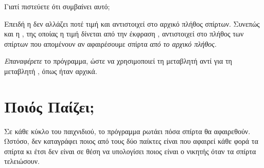\documentclass[a4paper,11pt,oneside]{book}
\begin{document}
\begin{step}
Γιατί πιστεύετε ότι συμβαίνει αυτό;

\begin{answer}
Επειδή η  δεν αλλάζει ποτέ τιμή και αντιστοιχεί στο αρχικό πλήθος σπίρτων. Συνεπώς και η , της οποίας η τιμή δίνεται από την έκφραση , αντιστοιχεί στο πλήθος των σπίρτων που απομένουν αν αφαιρέσουμε  σπίρτα \emph{από το αρχικό πλήθος}.
\end{answer}


\emph{Επαναφέρετε} το πρόγραμμα, ώστε να χρησιμοποιεί τη μεταβλητή  αντί για τη μεταβλητή , όπως ήταν αρχικά.
\end{step}

\section{Ποιός Παίζει;}
Σε κάθε κύκλο του παιχνιδιού, το πρόγραμμα ρωτάει πόσα σπίρτα θα αφαιρεθούν. Ωστόσο, δεν καταγράφει ποιος από τους δύο παίκτες είναι που αφαιρεί κάθε φορά τα σπίρτα κι έτσι δεν είναι σε θέση να υπολογίσει ποιος είναι ο νικητής όταν τα σπίρτα τελειώσουν.
\end{document}
